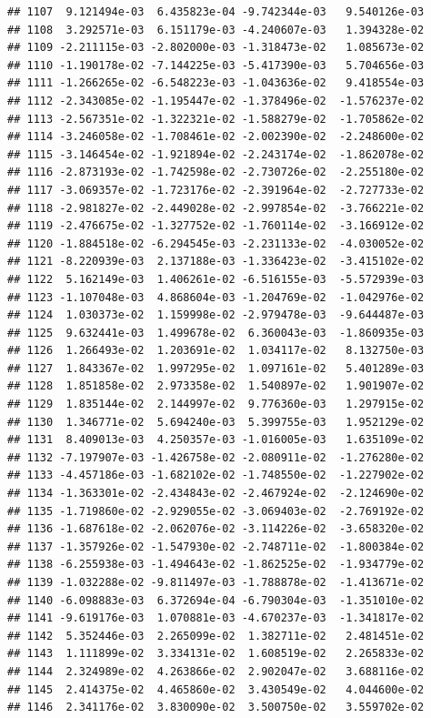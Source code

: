 \documentclass[
]{article}
\begin{document}
\begin{verbatim}
## 1107  9.121494e-03  6.435823e-04 -9.742344e-03   9.540126e-03
## 1108  3.292571e-03  6.151179e-03 -4.240607e-03   1.394328e-02
## 1109 -2.211115e-03 -2.802000e-03 -1.318473e-02   1.085673e-02
## 1110 -1.190178e-02 -7.144225e-03 -5.417390e-03   5.704656e-03
## 1111 -1.266265e-02 -6.548223e-03 -1.043636e-02   9.418554e-03
## 1112 -2.343085e-02 -1.195447e-02 -1.378496e-02  -1.576237e-02
## 1113 -2.567351e-02 -1.322321e-02 -1.588279e-02  -1.705862e-02
## 1114 -3.246058e-02 -1.708461e-02 -2.002390e-02  -2.248600e-02
## 1115 -3.146454e-02 -1.921894e-02 -2.243174e-02  -1.862078e-02
## 1116 -2.873193e-02 -1.742598e-02 -2.730726e-02  -2.255180e-02
## 1117 -3.069357e-02 -1.723176e-02 -2.391964e-02  -2.727733e-02
## 1118 -2.981827e-02 -2.449028e-02 -2.997854e-02  -3.766221e-02
## 1119 -2.476675e-02 -1.327752e-02 -1.760114e-02  -3.166912e-02
## 1120 -1.884518e-02 -6.294545e-03 -2.231133e-02  -4.030052e-02
## 1121 -8.220939e-03  2.137188e-03 -1.336423e-02  -3.415102e-02
## 1122  5.162149e-03  1.406261e-02 -6.516155e-03  -5.572939e-03
## 1123 -1.107048e-03  4.868604e-03 -1.204769e-02  -1.042976e-02
## 1124  1.030373e-02  1.159998e-02 -2.979478e-03  -9.644487e-03
## 1125  9.632441e-03  1.499678e-02  6.360043e-03  -1.860935e-03
## 1126  1.266493e-02  1.203691e-02  1.034117e-02   8.132750e-03
## 1127  1.843367e-02  1.997295e-02  1.097161e-02   5.401289e-03
## 1128  1.851858e-02  2.973358e-02  1.540897e-02   1.901907e-02
## 1129  1.835144e-02  2.144997e-02  9.776360e-03   1.297915e-02
## 1130  1.346771e-02  5.694240e-03  5.399755e-03   1.952129e-02
## 1131  8.409013e-03  4.250357e-03 -1.016005e-03   1.635109e-02
## 1132 -7.197907e-03 -1.426758e-02 -2.080911e-02  -1.276280e-02
## 1133 -4.457186e-03 -1.682102e-02 -1.748550e-02  -1.227902e-02
## 1134 -1.363301e-02 -2.434843e-02 -2.467924e-02  -2.124690e-02
## 1135 -1.719860e-02 -2.929055e-02 -3.069403e-02  -2.769192e-02
## 1136 -1.687618e-02 -2.062076e-02 -3.114226e-02  -3.658320e-02
## 1137 -1.357926e-02 -1.547930e-02 -2.748711e-02  -1.800384e-02
## 1138 -6.255938e-03 -1.494643e-02 -1.862525e-02  -1.934779e-02
## 1139 -1.032288e-02 -9.811497e-03 -1.788878e-02  -1.413671e-02
## 1140 -6.098883e-03  6.372694e-04 -6.790304e-03  -1.351010e-02
## 1141 -9.619176e-03  1.070881e-03 -4.670237e-03  -1.341817e-02
## 1142  5.352446e-03  2.265099e-02  1.382711e-02   2.481451e-02
## 1143  1.111899e-02  3.334131e-02  1.608519e-02   2.265833e-02
## 1144  2.324989e-02  4.263866e-02  2.902047e-02   3.688116e-02
## 1145  2.414375e-02  4.465860e-02  3.430549e-02   4.044600e-02
## 1146  2.341176e-02  3.830090e-02  3.500750e-02   3.559702e-02

\end{verbatim}
\end{document}
